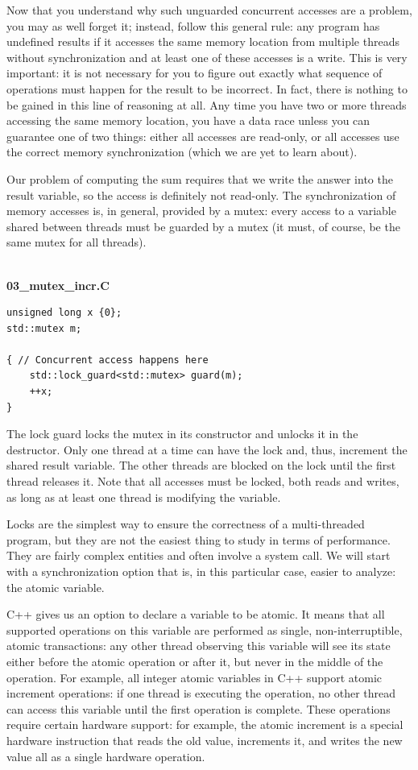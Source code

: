 Now that you understand why such unguarded concurrent accesses are a problem, you may as well forget it; instead, follow this general rule: any program has undefined results if it accesses the same memory location from multiple threads without synchronization and at least one of these accesses is a write. This is very important: it is not necessary for you to figure out exactly what sequence of operations must happen for the result to be incorrect. In fact, there is nothing to be gained in this line of reasoning at all. Any time you have two or more threads accessing the same memory location, you have a data race unless you can guarantee one of two things: either all accesses are read-only, or all accesses use the correct memory synchronization (which we are yet to learn about).

Our problem of computing the sum requires that we write the answer into the result variable, so the access is definitely not read-only. The synchronization of memory accesses is, in general, provided by a mutex: every access to a variable shared between threads must be guarded by a mutex (it must, of course, be the same mutex for all threads).

\hspace*{\fill} \\ %
\noindent
\textbf{03\_mutex\_incr.C}
\begin{lstlisting}[style=styleCXX]
unsigned long x {0};
std::mutex m;

{ // Concurrent access happens here
	std::lock_guard<std::mutex> guard(m);
	++x;
}
\end{lstlisting}

The lock guard locks the mutex in its constructor and unlocks it in the destructor. Only one thread at a time can have the lock and, thus, increment the shared result variable. The other threads are blocked on the lock until the first thread releases it. Note that all accesses must be locked, both reads and writes, as long as at least one thread is modifying the variable.

Locks are the simplest way to ensure the correctness of a multi-threaded program, but they are not the easiest thing to study in terms of performance. They are fairly complex entities and often involve a system call. We will start with a synchronization option that is, in this particular case, easier to analyze: the atomic variable.

C++ gives us an option to declare a variable to be atomic. It means that all supported operations on this variable are performed as single, non-interruptible, atomic transactions: any other thread observing this variable will see its state either before the atomic operation or after it, but never in the middle of the operation. For example, all integer atomic variables in C++ support atomic increment operations: if one thread is executing the operation, no other thread can access this variable until the first operation is complete. These operations require certain hardware support: for example, the atomic increment is a special hardware instruction that reads the old value, increments it, and writes the new value all as a single hardware operation.

